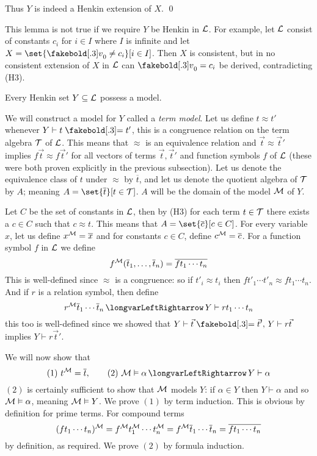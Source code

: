 Thus $Y$ is indeed a Henkin extension of $X$.
\qed

This lemma is not true if we require $Y$ be Henkin in ${\cal L}$.
For example, let ${\cal L}$ consist of constants $c_i$ for $i\in I$ where $I$ is infinite and let $X=\set{\v_0\neq c_i}[i\in I]$.
Then $X$ is consistent, but in no consistent extension of $X$ in ${\cal L}$ can $\v_0=c_i$ be derived, contradicting (H3).

\blemm

    Every Henkin set $Y\subseteq{\cal L}$ possess a model.

\elemm

We will construct a model for $Y$ called a {\it term model}.
Let us define $t\approx t'$ whenever $Y\vdash t\eq t'$, this is a congruence relation on the term algebra ${\cal T}$ of ${\cal L}$.
This means that $\approx$ is an equivalence relation and $\vec t\approx\vec t'$ implies $f\vec t\approx f\vec t'$ for all vectors of terms $\vec t,\vec t'$ and function symbols $f$ of ${\cal L}$ (these
were both proven explicitly in the previous subsection).
Let us denote the equivalence class of $t$ under $\approx$ by $\overline t$, and let us denote the quotient algebra of ${\cal T}$ by $A$; meaning $A=\set{\overline t}[t\in{\cal T}]$.
$A$ will be the domain of the model ${\cal M}$ of $Y$.

Let $C$ be the set of constants in ${\cal L}$, then by (H3) for each term $t\in{\cal T}$ there exists a $c\in C$ such that $c\approx t$.
This means that $A=\set{\overline c}[c\in C]$.
For every variable $x$, let us define $x^{\cal M}=\overline x$ and for constants $c\in C$, define $c^{\cal M}=\overline c$.
For a function symbol $f$ in ${\cal L}$ we define
$$ f^{\cal M}(\overline t_1,\dots,\overline t_n) = \overline{ft_1\cdots t_n} $$
This is well-defined since $\approx$ is a congruence: so if $t'_i\approx t_i$ then $ft'_1\cdots t'_n\approx ft_1\cdots t_n$.
And if $r$ is a relation symbol, then define
$$ r^{\cal M}\overline t_1\cdots\overline t_n \iff Y\vdash rt_1\cdots t_n $$
this too is well-defined since we showed that $Y\vdash\vec t\eq\vec t',\,Y\vdash r\vec t$ implies $Y\vdash r\vec t'$.

We will now show that
$$ (1)\ t^{\cal M} = \overline t,\qquad (2)\ {\cal M}\vDash\alpha\iff Y\vdash\alpha $$
$(2)$ is certainly sufficient to show that ${\cal M}$ models $Y$: if $\alpha\in Y$ then $Y\vdash\alpha$ and so ${\cal M}\vDash\alpha$, meaning ${\cal M}\vDash Y$.
We prove $(1)$ by term induction.
This is obvious by definition for prime terms.
For compound terms
$$ (ft_1\cdots t_n)^{\cal M} = f^{\cal M}t_1^{\cal M}\cdots t_n^{\cal M} = f^{\cal M}\overline t_1\cdots\overline t_n = \overline{ft_1\cdots t_n} $$
by definition, as required.
We prove $(2)$ by formula induction.

